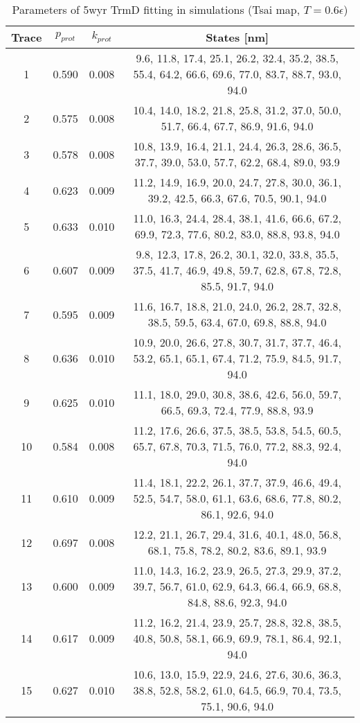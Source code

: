 \begin{table}
    \tiny
    \centering
    \caption{Parameters of 5wyr TrmD fitting in simulations (Tsai map, $T=0.6\epsilon$)}
    \label{tab:5wyr-pb-parameters}
    \begin{tabular}{c|c|c|c}
        \textbf{Trace} & \textbf{$p_{prot}$} & \textbf{$k_{prot}$} & \textbf{States [nm]}\\\hline
        1 & 0.590 & 0.008 & 9.6, 11.8, 17.4, 25.1, 26.2, 32.4, 35.2, 38.5, 55.4, 64.2, 66.6, 69.6, 77.0, 83.7, 88.7, 93.0, 94.0\\
        2 & 0.575 & 0.008 & 10.4, 14.0, 18.2, 21.8, 25.8, 31.2, 37.0, 50.0, 51.7, 66.4, 67.7, 86.9, 91.6, 94.0\\
        3 & 0.578 & 0.008 & 10.8, 13.9, 16.4, 21.1, 24.4, 26.3, 28.6, 36.5, 37.7, 39.0, 53.0, 57.7, 62.2, 68.4, 89.0, 93.9\\
        4 & 0.623 & 0.009 & 11.2, 14.9, 16.9, 20.0, 24.7, 27.8, 30.0, 36.1, 39.2, 42.5, 66.3, 67.6, 70.5, 90.1, 94.0\\
        5 & 0.633 & 0.010 & 11.0, 16.3, 24.4, 28.4, 38.1, 41.6, 66.6, 67.2, 69.9, 72.3, 77.6, 80.2, 83.0, 88.8, 93.8, 94.0\\
        6 & 0.607 & 0.009 & 9.8, 12.3, 17.8, 26.2, 30.1, 32.0, 33.8, 35.5, 37.5, 41.7, 46.9, 49.8, 59.7, 62.8, 67.8, 72.8, 85.5, 91.7, 94.0\\
        7 & 0.595 & 0.009 & 11.6, 16.7, 18.8, 21.0, 24.0, 26.2, 28.7, 32.8, 38.5, 59.5, 63.4, 67.0, 69.8, 88.8, 94.0\\
        8 & 0.636 & 0.010 & 10.9, 20.0, 26.6, 27.8, 30.7, 31.7, 37.7, 46.4, 53.2, 65.1, 65.1, 67.4, 71.2, 75.9, 84.5, 91.7, 94.0\\
        9 & 0.625 & 0.010 & 11.1, 18.0, 29.0, 30.8, 38.6, 42.6, 56.0, 59.7, 66.5, 69.3, 72.4, 77.9, 88.8, 93.9\\
        10 & 0.584 & 0.008 & 11.2, 17.6, 26.6, 37.5, 38.5, 53.8, 54.5, 60.5, 65.7, 67.8, 70.3, 71.5, 76.0, 77.2, 88.3, 92.4, 94.0\\
        11 & 0.610 & 0.009 & 11.4, 18.1, 22.2, 26.1, 37.7, 37.9, 46.6, 49.4, 52.5, 54.7, 58.0, 61.1, 63.6, 68.6, 77.8, 80.2, 86.1, 92.6, 94.0\\
        12 & 0.697 & 0.008 & 12.2, 21.1, 26.7, 29.4, 31.6, 40.1, 48.0, 56.8, 68.1, 75.8, 78.2, 80.2, 83.6, 89.1, 93.9\\
        13 & 0.600 & 0.009 & 11.0, 14.3, 16.2, 23.9, 26.5, 27.3, 29.9, 37.2, 39.7, 56.7, 61.0, 62.9, 64.3, 66.4, 66.9, 68.8, 84.8, 88.6, 92.3, 94.0\\
        14 & 0.617 & 0.009 & 11.2, 16.2, 21.4, 23.9, 25.7, 28.8, 32.8, 38.5, 40.8, 50.8, 58.1, 66.9, 69.9, 78.1, 86.4, 92.1, 94.0\\
        15 & 0.627 & 0.010 & 10.6, 13.0, 15.9, 22.9, 24.6, 27.6, 30.6, 36.3, 38.8, 52.8, 58.2, 61.0, 64.5, 66.9, 70.4, 73.5, 75.1, 90.6, 94.0\\
    \end{tabular}
\end{table}

